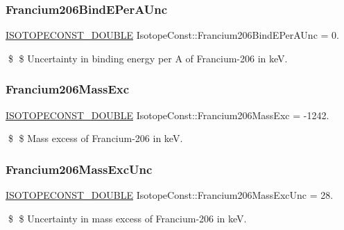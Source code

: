 \subsubsection{\texorpdfstring{Francium206\+Bind\+E\+Per\+A\+Unc}{Francium206BindEPerAUnc}}
{\footnotesize\ttfamily \mbox{\hyperlink{group___isotope_const-_macros_ga8f45a7272ce02c0b4c65c44636ed719a}{I\+S\+O\+T\+O\+P\+E\+C\+O\+N\+S\+T\+\_\+\+D\+O\+U\+B\+LE}} Isotope\+Const\+::\+Francium206\+Bind\+E\+Per\+A\+Unc = 0.}

\$ \$ Uncertainty in binding energy per A of Francium-\/206 in keV. \mbox{\label{group___isotope_const-_francium-_fr206_gae132fab68bce120bd64d1971bdf8512d}} 
\subsubsection{\texorpdfstring{Francium206\+Mass\+Exc}{Francium206MassExc}}
{\footnotesize\ttfamily \mbox{\hyperlink{group___isotope_const-_macros_ga8f45a7272ce02c0b4c65c44636ed719a}{I\+S\+O\+T\+O\+P\+E\+C\+O\+N\+S\+T\+\_\+\+D\+O\+U\+B\+LE}} Isotope\+Const\+::\+Francium206\+Mass\+Exc = -\/1242.}

\$ \$ Mass excess of Francium-\/206 in keV. \mbox{\label{group___isotope_const-_francium-_fr206_ga31b8a1318e646208afe5a91c73b5e2ae}} 
\subsubsection{\texorpdfstring{Francium206\+Mass\+Exc\+Unc}{Francium206MassExcUnc}}
{\footnotesize\ttfamily \mbox{\hyperlink{group___isotope_const-_macros_ga8f45a7272ce02c0b4c65c44636ed719a}{I\+S\+O\+T\+O\+P\+E\+C\+O\+N\+S\+T\+\_\+\+D\+O\+U\+B\+LE}} Isotope\+Const\+::\+Francium206\+Mass\+Exc\+Unc = 28.}

\$ \$ Uncertainty in mass excess of Francium-\/206 in keV. \mbox{\label{group___isotope_const-_francium-_fr206_ga30c162218bf802afeddb3015bd60a788}} 
